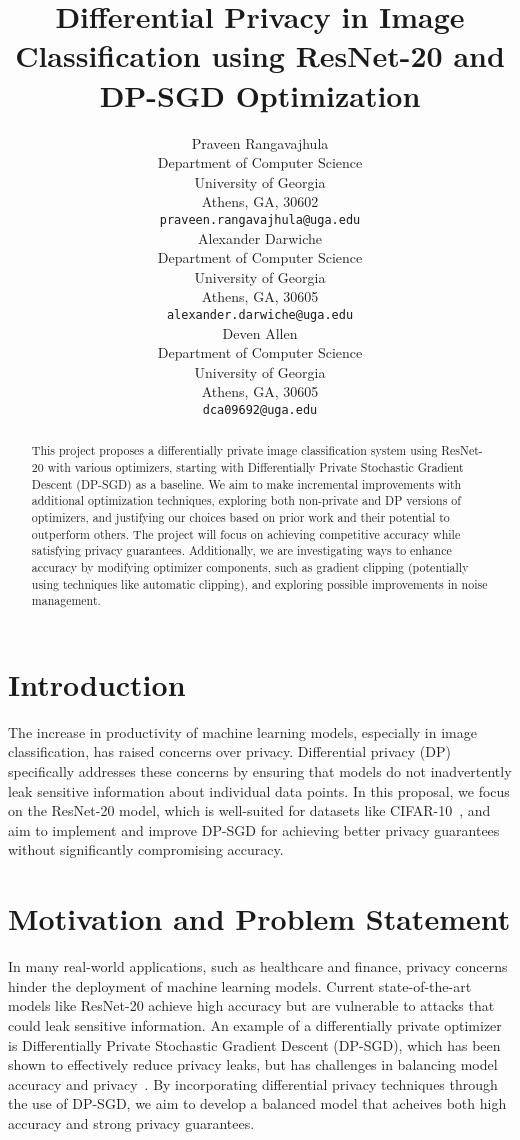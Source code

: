 \documentclass{article}
\title{Differential Privacy in Image Classification using ResNet-20 and DP-SGD Optimization}
\author{
    Praveen Rangavajhula\\
    Department of Computer Science\\
    University of Georgia\\
    Athens, GA, 30602\\
    \texttt{praveen.rangavajhula@uga.edu} \\
    \And
    Alexander Darwiche\\
    Department of Computer Science\\
    University of Georgia\\
    Athens, GA, 30605 \\
    \texttt{alexander.darwiche@uga.edu} \\
    \And
    Deven Allen\\
    Department of Computer Science\\
    University of Georgia\\
    Athens, GA, 30605 \\
    \texttt{dca09692@uga.edu} \\
}
\begin{document}
    \maketitle

    \begin{abstract}

        This project proposes a differentially private image classification system using ResNet-20 with various
        optimizers, starting with Differentially Private Stochastic Gradient Descent (DP-SGD) as a baseline.
        We aim to make incremental improvements with additional optimization techniques, exploring both non-private
        and DP versions of optimizers, and justifying our choices based on prior work and their potential
        to outperform others.
        The project will focus on achieving competitive accuracy while satisfying privacy guarantees.
        Additionally, we are investigating ways to enhance accuracy by modifying optimizer components,
        such as gradient clipping (potentially using techniques like automatic clipping), and exploring
        possible improvements in noise management.

    \end{abstract}


    \section{Introduction}\label{sec:introduction}

    The increase in productivity of machine learning models, especially in image classification, has raised concerns over privacy.
    Differential privacy (DP) specifically addresses these concerns by ensuring that models do not inadvertently leak sensitive
    information about individual data points.
    In this proposal, we focus on the ResNet-20 model, which is well-suited for datasets like CIFAR-10~\cite{Idelbayev_ResNet20},
    and aim to implement and improve DP-SGD for achieving better privacy guarantees without significantly compromising accuracy.


    \section{Motivation and Problem Statement}\label{sec:motivation-and-problem-statement}
    In many real-world applications, such as healthcare and finance, privacy concerns hinder the deployment of machine
    learning models.
    Current state-of-the-art models like ResNet-20 achieve high accuracy but are vulnerable to attacks that could leak
    sensitive information.
    An example of a differentially private optimizer is Differentially Private Stochastic Gradient Descent (DP-SGD), which has been shown
    to effectively reduce privacy leaks, but has challenges in balancing model accuracy and privacy~\cite{Abadi_2016_DeepLearningDifferentialPrivacy}.
    By incorporating differential privacy techniques through the use of DP-SGD, we aim to develop a balanced model that acheives both high accuracy
    and strong privacy guarantees.
\end{document}
